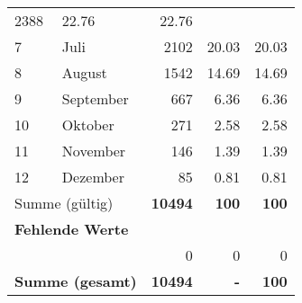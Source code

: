 \begin{longtable}{lXrrr}
       \num{2388} &
       \num[round-mode=places,round-precision=2]{22,76} &
         \num[round-mode=places,round-precision=2]{22,76} \\

     7 &
     \multicolumn{1}{X}{ Juli   } &


       \num{2102} &
       \num[round-mode=places,round-precision=2]{20,03} &
         \num[round-mode=places,round-precision=2]{20,03} \\

     8 &
     \multicolumn{1}{X}{ August   } &


       \num{1542} &
       \num[round-mode=places,round-precision=2]{14,69} &
         \num[round-mode=places,round-precision=2]{14,69} \\

     9 &
     \multicolumn{1}{X}{ September   } &


       \num{667} &
       \num[round-mode=places,round-precision=2]{6,36} &
         \num[round-mode=places,round-precision=2]{6,36} \\

     10 &
     \multicolumn{1}{X}{ Oktober   } &


       \num{271} &
       \num[round-mode=places,round-precision=2]{2,58} &
         \num[round-mode=places,round-precision=2]{2,58} \\

     11 &
     \multicolumn{1}{X}{ November   } &


       \num{146} &
       \num[round-mode=places,round-precision=2]{1,39} &
         \num[round-mode=places,round-precision=2]{1,39} \\

     12 &
     \multicolumn{1}{X}{ Dezember   } &


       \num{85} &
       \num[round-mode=places,round-precision=2]{0,81} &
         \num[round-mode=places,round-precision=2]{0,81} \\
     \midrule
     \multicolumn{2}{l}{Summe (gültig)} &
       \textbf{\num{10494}} &
     \textbf{100} &
       \textbf{\num[round-mode=places,round-precision=2]{100}} \\
     \multicolumn{5}{l}{\textbf{Fehlende Werte}}\\
      & & 0 & 0 & 0 \\
     \midrule
     \multicolumn{2}{l}{\textbf{Summe (gesamt)}} &
          \textbf{\num{10494}} &
        \textbf{-} &
        \textbf{100} \\
     \bottomrule
     \end{longtable}
     
